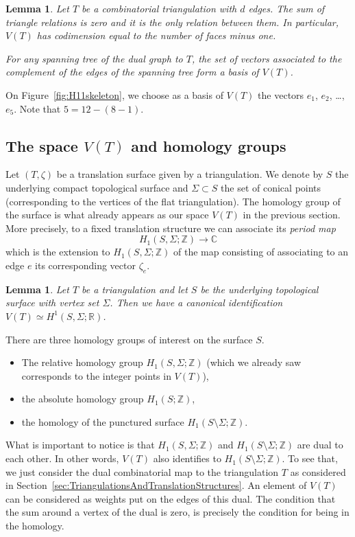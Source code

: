 \documentclass[a4paper,12pt]{article}
\def\bC{\mathbb{C}}
\def\bR{\mathbb{R}}
\def\bZ{\mathbb{Z}}
\newtheorem{lemma}[definition]{Lemma}
\begin{document}
\begin{lemma}
Let $T$ be a combinatorial triangulation with $d$ edges. The sum of triangle
relations is zero and it is the only relation between them. In particular,
$V(T)$ has codimension equal to the number of faces minus one.

For any spanning tree of the dual graph to $T$, the set of vectors associated to the
complement of the edges of the spanning tree form a basis of $V(T)$.
\end{lemma}

On Figure~\ref{fig:H11skeleton}, we choose as a basis of $V(T)$ the vectors
$e_1$, $e_2$, \ldots, $e_5$. Note that $5 = 12 - (8 - 1)$.

\subsection{The space $V(T)$ and homology groups}
Let $(T, \zeta)$ be a translation surface given by a triangulation. We denote
by $S$ the underlying compact topological surface and $\Sigma \subset S$ the
set of conical points (corresponding to the vertices of the flat
triangulation). The homology group of the surface is what already appears as
our space $V(T)$ in the previous section. More precisely, to a fixed
translation structure we can associate its \emph{period map}
\[
H_1(S, \Sigma; \bZ) \to \bC
\]
which is the extension to $H_1(S, \Sigma; \bZ)$ of the map consisting of associating to
an edge $e$ its corresponding vector $\zeta_e$.
\begin{lemma}
Let $T$ be a triangulation and let $S$ be the underlying topological surface
with vertex set $\Sigma$. Then we have a canonical identification
$V(T) \simeq H^1(S, \Sigma; \bR)$.
\end{lemma}

There are three homology groups of interest on the surface $S$.
\begin{itemize}
\item The relative homology group $H_1(S, \Sigma; \bZ)$ (which we already saw corresponds to the integer points in $V(T)$),
\item the absolute homology group $H_1(S; \bZ)$,
\item the homology of the punctured surface $H_1(S \setminus \Sigma; \bZ)$.
\end{itemize}

What is important to notice is that $H_1(S, \Sigma; \bZ)$ and $H_1(S \setminus
\Sigma; \bZ)$ are dual to each other. In other words, $V(T)$ also identifies
to $H_1(S \setminus \Sigma; \bZ)$. To see that, we just consider the dual
combinatorial map to the triangulation $T$ as considered in
Section~\ref{sec:TriangulationsAndTranslationStructures}. An element of
$V(T)$ can be considered as weights put on the edges of this dual.
The condition that the sum around a vertex of the dual is zero,
is precisely the condition for being in the homology.
\end{document}

